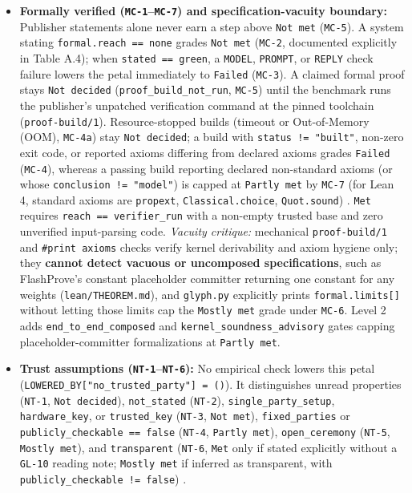 \documentclass[11pt,letterpaper]{article}
\begin{document}
\begin{itemize}
\item \textbf{Formally verified (\texttt{MC-1}--\texttt{MC-7}) and specification-vacuity boundary:} Publisher statements alone never earn a step above \texttt{Not met} (\texttt{MC-5}). A system stating \texttt{formal.\allowbreak{}reach == none} grades \texttt{Not met} (\texttt{MC-2}, documented explicitly in Table A.4); when \texttt{stated == green}, a \texttt{MODEL}, \texttt{PROMPT}, or \texttt{REPLY} check failure lowers the petal immediately to \texttt{Failed} (\texttt{MC-3}). A claimed formal proof stays \texttt{Not decided} (\texttt{proof\_\allowbreak{}build\_\allowbreak{}not\_\allowbreak{}run}, \texttt{MC-5}) until the benchmark runs the publisher's unpatched verification command at the pinned toolchain (\texttt{proof-\allowbreak{}build/\allowbreak{}1}). Resource-stopped builds (timeout or Out-of-Memory (OOM), \texttt{MC-4a}) stay \texttt{Not decided}; a build with \texttt{status != "built"}, non-zero exit code, or reported axioms differing from declared axioms grades \texttt{Failed} (\texttt{MC-4}), whereas a passing build reporting declared non-standard axioms (or whose \texttt{conclusion != "model"}) is capped at \texttt{Partly met} by \texttt{MC-7} (for Lean 4, standard axioms are \texttt{propext}, \texttt{Classical.\allowbreak{}choice}, \texttt{Quot.\allowbreak{}sound}) \cite{iproofs2026}. \texttt{Met} requires \texttt{reach == verifier\_\allowbreak{}run} \cite{rinberg2026flashprove} with a non-empty trusted base and zero unverified input-parsing code. \textit{Vacuity critique:} mechanical \texttt{proof-\allowbreak{}build/\allowbreak{}1} and \texttt{\#print axioms} checks verify kernel derivability and axiom hygiene only; they \textbf{cannot detect vacuous or uncomposed specifications}, such as FlashProve's constant placeholder committer returning one constant for any weights (\texttt{lean/\allowbreak{}THEOREM.\allowbreak{}md}), and \texttt{glyph.\allowbreak{}py} explicitly prints \texttt{formal.\allowbreak{}limits[]} without letting those limits cap the \texttt{Mostly met} grade under \texttt{MC-6}. Level 2 adds \texttt{end\_\allowbreak{}to\_\allowbreak{}end\_\allowbreak{}composed} and \texttt{kernel\_\allowbreak{}soundness\_\allowbreak{}advisory} gates capping placeholder-committer formalizations at \texttt{Partly met}.
\item \textbf{Trust assumptions (\texttt{NT-1}--\texttt{NT-6}):} No empirical check lowers this petal (\texttt{LOWERED\_\allowbreak{}BY["no\_\allowbreak{}trusted\_\allowbreak{}party"] = ()}). It distinguishes unread properties (\texttt{NT-1}, \texttt{Not decided}), \texttt{not\_\allowbreak{}stated} (\texttt{NT-2}), \texttt{single\_\allowbreak{}party\_\allowbreak{}setup}, \texttt{hardware\_\allowbreak{}key}, or \texttt{trusted\_\allowbreak{}key} (\texttt{NT-3}, \texttt{Not met}), \texttt{fixed\_\allowbreak{}parties} or \texttt{publicly\_\allowbreak{}checkable == false} (\texttt{NT-4}, \texttt{Partly met}), \texttt{open\_\allowbreak{}ceremony} (\texttt{NT-5}, \texttt{Mostly met}), and \texttt{transparent} (\texttt{NT-6}, \texttt{Met} only if stated explicitly without a \texttt{GL-10} reading note; \texttt{Mostly met} if inferred as transparent, with \texttt{publicly\_\allowbreak{}checkable != false}) \cite{iproofs2026}.
\end{itemize}
\end{document}
